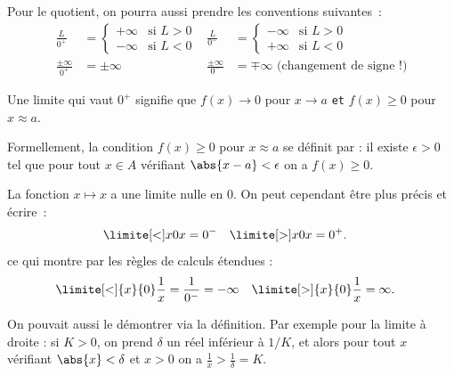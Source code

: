 \begin{frame}
  \begin{proposition}
Pour le quotient, on pourra aussi prendre les conventions suivantes~:
\begin{align*}
  \frac{L}{0^+}&=
  \begin{cases}
    + \infty &\textrm{si } L > 0\\
    - \infty &\textrm{si } L < 0
  \end{cases}&
  \frac{L}{0^-}&=
  \begin{cases}
    - \infty &\textrm{si } L > 0\\
    + \infty &\textrm{si } L < 0
  \end{cases}\\
  \frac{\pm \infty}{0^+}&=\pm \infty&
  \frac{\pm \infty}{0^-}&=\mp \infty \text{ (changement de signe !)}
\end{align*}
\end{proposition}
\begin{remark}
  Une limite qui vaut $0^+$ signifie que $f(x) \to 0$ pour \(x \to a\) \texttt{et} $f(x) \geq 0$ pour $x \approx a$.
\end{remark}\pause
\begin{definition}
  Formellement, la condition $f(x) \geq 0$ pour $x \approx a$ se définit par : il existe \(\epsilon > 0\) tel que pour tout \(x\in A\) vérifiant \(\abs{x-a} < \epsilon\) on a \(f(x) \geq 0\).
\end{definition}
\end{frame}
\begin{frame}
  \begin{example}
    La fonction \(x \mapsto x\) a une limite nulle en \(0\). On peut cependant être plus précis et écrire~:
    \begin{align*}
      \limite[<] x 0 x &= 0^{-} & \limite[>] x 0 x &= 0^{+}.
    \end{align*}
    ce qui montre par les règles de calculs étendues :
    \begin{align*}
      \limite[<]{x}{0} \frac{1}{x} &= \frac{1}{0^{-}} = -\infty & \limite[>]{x}{0} \frac{1}{x} &= \infty.
    \end{align*}
  
    On pouvait aussi le démontrer via la définition. Par exemple pour la limite à droite : si \(K > 0\), on prend \(\delta\) un réel inférieur à \(1/K\), et alors pour tout \(x\) vérifiant \(\abs{x} < \delta\) et \(x > 0\) on a \(\frac{1}{x} > \frac{1}{\delta} = K\).
  \end{example}
\end{frame}


